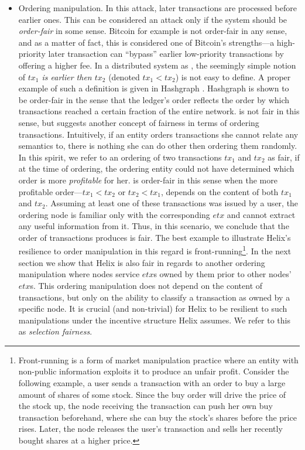 \begin{itemize}
\item Ordering manipulation. In this attack, later transactions are processed before earlier ones. This can be considered an attack only if the system should be \emph{order-fair} in some sense. Bitcoin for example is not order-fair in any sense, and as a matter of fact, this is considered one of Bitcoin's strengths---a high-priority later transaction can ``bypass'' earlier low-priority transactions by offering a higher fee. In a distributed system as \nameNS, the seemingly simple notion of \emph{$tx_1$ is earlier then $tx_2$} (denoted $tx_1<tx_2$) is not easy to define. A proper example of such a definition is given in Hashgraph \cite{Hashgraph}. Hashgraph is shown to be order-fair in the sense that the ledger's order reflects the order by which transactions reached a certain fraction of the entire network. \name is not fair in this sense, but suggests another concept of fairness in terms of ordering transactions. Intuitively, if an entity orders transactions she cannot relate any semantics to, there is nothing she can do other then ordering them randomly. In this spirit, we refer to an ordering of two transactions $tx_1$ and $tx_2$ as fair, if at the time of ordering, the ordering entity could not have determined which order is more \emph{profitable} for her.
\name is order-fair in this sense when the more profitable order---$tx_1<tx_2$ or $tx_2<tx_1$, depends on the content of both $tx_1$ and $tx_2$. Assuming at least one of these transactions was issued by a user, the ordering node is familiar only with the corresponding $etx$ and cannot extract any useful information from it. Thus, in this scenario, we conclude that the order of transactions \name produces is fair. The best example to illustrate Helix's resilience to order manipulation in this regard is front-running\footnote{Front-running is a form of market manipulation practice where an entity with non-public information exploits it to produce an unfair profit. Consider the following example, a user sends a transaction with an order to buy a large amount of shares of some stock. Since the buy order will drive the price of the stock up, the node receiving the transaction can push her own buy transaction beforehand, where she can buy the stock's shares before the price rises. Later, the node releases the user's transaction and sells her recently bought shares at a higher price.}.
In the next section we show that Helix is also fair in regards to another ordering manipulation where nodes service $etx$s owned by them prior to other nodes' $etx$s. This ordering manipulation does not depend on the content of transactions, but only on the ability to classify a transaction as owned by a specific node. It is crucial (and non-trivial) for Helix to be resilient to such manipulations under the incentive structure Helix assumes. We refer to this as \emph{selection fairness}.
\end{itemize}